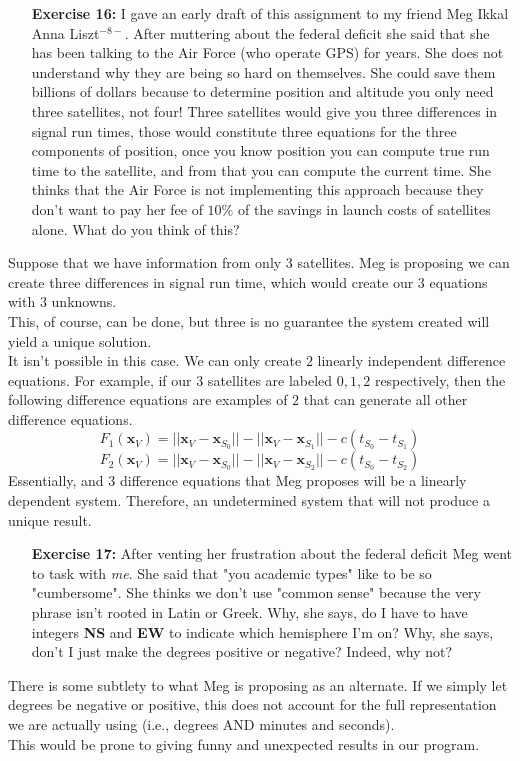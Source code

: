 \documentclass[11pt]{article}
\theoremstyle{definition}
\newcommand{\1}[1]{\mathbf{1} \left \{ #1 \right \}}
\begin{document}
\begin{itemize}
\item[{\textbf{Exercise 16:}}] I gave an early draft of this assignment to my friend Meg Ikkal Anna Liszt$^{-8-}$.  After muttering about the federal deficit she said that she has been talking to the Air Force (who operate GPS) for years.  She does not understand why they are being so hard on themselves.  She could save them billions of dollars because to determine position and altitude you only need three satellites, not four!  Three satellites would give you three differences in signal run times, those would constitute three equations for the three components of position, once you know position you can compute true run time to the satellite, and from that you can compute the current time.  She thinks that the Air Force is not implementing this approach because they don't want to pay her fee of $10\%$ of the savings in launch costs of satellites alone.  What do you think of this?
\end{itemize}
Suppose that we have information from only $3$ satellites.  Meg is proposing we can create three differences in signal run time, which would create our $3$ equations with $3$ unknowns. \\
This, of course, can be done, but three is no guarantee the system created will yield a unique solution. \\
It isn't possible in this case.  We can only create $2$ linearly independent difference equations.  For example, if our $3$ satellites are labeled $0,1,2$ respectively, then the following difference equations are examples of $2$ that can generate all other difference equations.
\[F_1 (\textbf{x}_V) = ||\textbf{x}_V - \textbf{x}_{S_0}|| - ||\textbf{x}_V - \textbf{x}_{S_1}|| - c(t_{S_0} - t_{S_1})\]
\[F_2 (\textbf{x}_V) = ||\textbf{x}_V - \textbf{x}_{S_0}|| - ||\textbf{x}_V - \textbf{x}_{S_2}|| - c(t_{S_0} - t_{S_2})\]
Essentially, and $3$ difference equations that Meg proposes will be a linearly dependent system.  Therefore, an undetermined system that will not produce a unique result.

\begin{itemize}
\item[{\textbf{Exercise 17:}}] After venting her frustration about the federal deficit Meg went to task with \textit{me}.  She said that "you academic types" like to be so "cumbersome".  She thinks we don't use "common sense" because the very phrase isn't rooted in Latin or Greek.  Why, she says, do I have to have integers \textbf{NS} and \textbf{EW} to indicate which hemisphere I'm on?  Why, she says, don't I just make the degrees positive or negative?  Indeed, why not?
\end{itemize}
There is some subtlety to what Meg is proposing as an alternate.  If we simply let degrees be negative or positive, this does not account for the full representation we are actually using (i.e., degrees AND minutes and seconds). \\
This would be prone to giving funny and unexpected results in our program.
\end{document}
